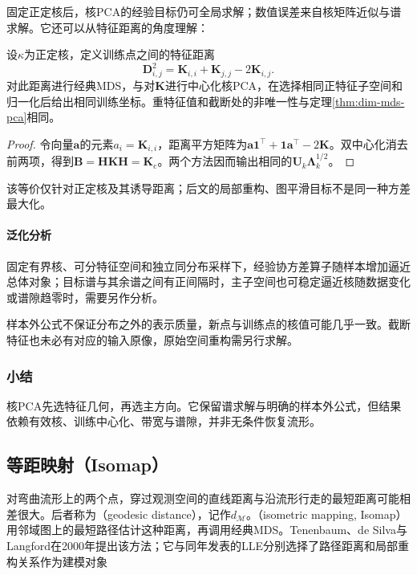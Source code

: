 固定正定核后，核PCA的经验目标仍可全局求解；数值误差来自核矩阵近似与谱求解。它还可以从特征距离的角度理解：

\begin{theorem}[核诱导距离下的等价关系]
  \label{thm:dim-kpca-mds}
  设$\kappa$为正定核，定义训练点之间的特征距离
  \[
    \bm{D}_{i,j}^2
    =\bm{K}_{i,i}+\bm{K}_{j,j}-2\bm{K}_{i,j}.
  \]
  对此距离进行经典MDS，与对$\bm{K}$进行中心化核PCA，在选择相同正特征子空间和归一化后给出相同训练坐标。重特征值和截断处的非唯一性与定理\ref{thm:dim-mds-pca}相同。
\end{theorem}
\begin{proof}
  令向量$\bm{a}$的元素$a_i=\bm{K}_{i,i}$，距离平方矩阵为$\bm{a}\bm{1}^{\top}+\bm{1}\bm{a}^{\top}-2\bm{K}$。双中心化消去前两项，得到$\bm{B}=\bm{H}\bm{K}\bm{H}=\bm{K}_{\mathrm{c}}$。两个方法因而输出相同的$\bm{U}_k\bm{\Lambda}_k^{1/2}$。
\end{proof}

该等价仅针对正定核及其诱导距离；后文的局部重构、图平滑目标不是同一种方差最大化。

\paragraph{泛化分析}

固定有界核、可分特征空间和独立同分布采样下，经验协方差算子随样本增加逼近总体对象；目标谱与其余谱之间有正间隔时，主子空间也可稳定逼近核随数据变化或谱隙趋零时，需要另作分析。

样本外公式不保证分布之外的表示质量，新点与训练点的核值可能几乎一致。截断特征也未必有对应的输入原像，原始空间重构需另行求解。

\subsubsection{小结}

核PCA先选特征几何，再选主方向。它保留谱求解与明确的样本外公式，但结果依赖有效核、训练中心化、带宽与谱隙，并非无条件恢复流形。

\subsection{等距映射（Isomap）}
\label{sec:dim-isomap}

对弯曲流形上的两个点，穿过观测空间的直线距离与沿流形行走的最短距离可能相差很大。后者称为（geodesic distance），记作$d_{\mathcal{M}}$。（isometric mapping, Isomap）用邻域图上的最短路径估计这种距离，再调用经典MDS。Tenenbaum、de Silva与Langford在2000年提出该方法；它与同年发表的LLE分别选择了路径距离和局部重构关系作为建模对象

